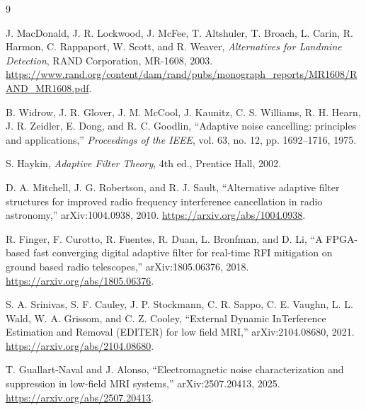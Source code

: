 \documentclass[10pt]{article}
\begin{document}
\begin{thebibliography}{9}

J. MacDonald, J. R. Lockwood, J. McFee, T. Altshuler, T. Broach,
L. Carin, R. Harmon, C. Rappaport, W. Scott, and R. Weaver,
\emph{Alternatives for Landmine Detection}, RAND Corporation, MR-1608,
2003.
\url{https://www.rand.org/content/dam/rand/pubs/monograph_reports/MR1608/RAND_MR1608.pdf}.

B. Widrow, J. R. Glover, J. M. McCool, J. Kaunitz, C. S. Williams,
R. H. Hearn, J. R. Zeidler, E. Dong, and R. C. Goodlin,
``Adaptive noise cancelling: principles and applications,''
\emph{Proceedings of the IEEE}, vol. 63, no. 12, pp. 1692--1716, 1975.

S. Haykin, \emph{Adaptive Filter Theory}, 4th ed., Prentice Hall, 2002.

D. A. Mitchell, J. G. Robertson, and R. J. Sault,
``Alternative adaptive filter structures for improved radio frequency
interference cancellation in radio astronomy,'' arXiv:1004.0938, 2010.
\url{https://arxiv.org/abs/1004.0938}.

R. Finger, F. Curotto, R. Fuentes, R. Duan, L. Bronfman, and D. Li,
``A FPGA-based fast converging digital adaptive filter for real-time RFI
mitigation on ground based radio telescopes,'' arXiv:1805.06376, 2018.
\url{https://arxiv.org/abs/1805.06376}.

S. A. Srinivas, S. F. Cauley, J. P. Stockmann, C. R. Sappo,
C. E. Vaughn, L. L. Wald, W. A. Grissom, and C. Z. Cooley,
``External Dynamic InTerference Estimation and Removal (EDITER) for low
field MRI,'' arXiv:2104.08680, 2021.
\url{https://arxiv.org/abs/2104.08680}.

T. Guallart-Naval and J. Alonso,
``Electromagnetic noise characterization and suppression in low-field MRI
systems,'' arXiv:2507.20413, 2025.
\url{https://arxiv.org/abs/2507.20413}.

\end{thebibliography}
\end{document}
